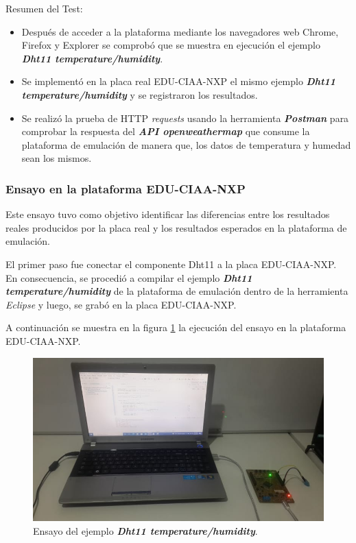 Resumen del Test:
\begin{itemize}
	\item Después de acceder a la plataforma mediante los navegadores web Chrome, Firefox y Explorer se comprobó que se muestra en ejecución el ejemplo \textit{\textbf{Dht11 temperature/humidity}}.
	\item Se implementó en la placa real EDU-CIAA-NXP  el mismo ejemplo \textit{\textbf{Dht11 temperature/humidity}} y se registraron los resultados.
	\item Se realizó la prueba de HTTP \textit{requests} usando la herramienta \textit{\textbf{Postman}} para comprobar la respuesta del \textit{\textbf{API openweathermap}} que consume la plataforma de emulación de manera que, los datos de temperatura y humedad sean los mismos.
\end{itemize}

\subsubsection{Ensayo en la plataforma EDU-CIAA-NXP} 

Este ensayo tuvo como objetivo identificar
las diferencias entre los resultados reales producidos por la placa real y los resultados esperados en la plataforma de emulación.

El primer paso fue conectar el componente Dht11 a la placa EDU-CIAA-NXP. En consecuencia, se procedió a compilar el ejemplo \textit{\textbf{Dht11 temperature/humidity}} de la plataforma de emulación dentro de la herramienta 
\textit{Eclipse} y luego, se grabó en la placa EDU-CIAA-NXP.

A continuación se muestra en la figura \ref{fig:TestHardware} la ejecución del ensayo en la plataforma EDU-CIAA-NXP.

\begin{figure}[ht]
	\centering
	\includegraphics[scale=.49]{./Figures/TestHardware.jpeg}
	\caption{Ensayo del ejemplo \textit{\textbf{Dht11 temperature/humidity}}.}
	\label{fig:TestHardware}
\end{figure}



